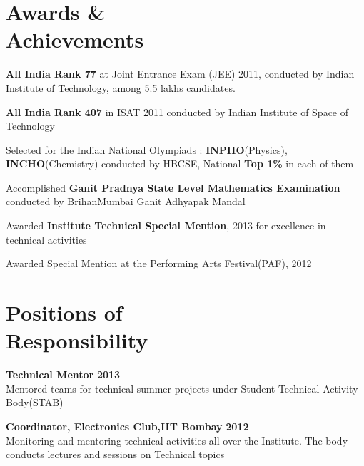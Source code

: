 \documentclass[margin,11pt]{resume}
\begin{document}
\begin{resume}

\vspace{45mm}

\section{\mysidestyle Awards \&\\ Achievements}

\begin{list2}
\item \textbf {All India Rank 77} at Joint Entrance Exam (JEE) 2011, conducted by Indian Institute of Technology, among 5.5 lakhs candidates. 
\item \textbf {All India Rank 407} in ISAT 2011 conducted by Indian Institute of Space of Technology 
\item Selected for the Indian National Olympiads : \textbf{INPHO}(Physics), \textbf{INCHO}(Chemistry) conducted by HBCSE, National \textbf{Top 1\%} in each of them
\item Accomplished \textbf {Ganit Pradnya State Level Mathematics Examination} conducted by BrihanMumbai Ganit Adhyapak Mandal
\item Awarded \textbf{Institute Technical Special Mention}, 2013 for excellence in technical activities
\item Awarded Special Mention at the Performing Arts Festival(PAF), 2012
				
\vspace{-3mm}
\end{list2}\vspace{0.25mm}
\section{\mysidestyle Positions of\\ Responsibility}

\begin{list2}
\item \textbf{Technical Mentor} \hfill\textbf{2013}\\
				Mentored teams for technical summer projects under Student Technical Activity Body(STAB)
\item \textbf{Coordinator, Electronics Club,IIT Bombay} \hfill \textbf{2012}\\
				Monitoring and mentoring technical activities all over the Institute. The body conducts lectures and sessions on Technical topics
\end{list2}
\vspace{-3mm}


\end{resume}
\end{document}
